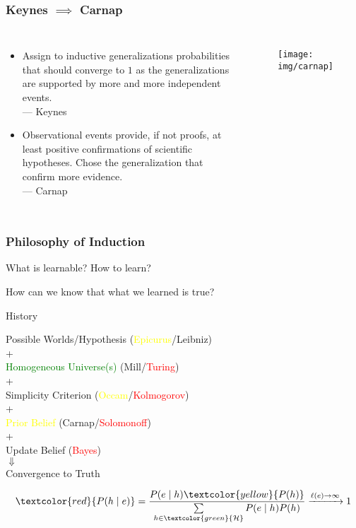 \documentclass[UTF8,11pt,colorlinks,compress,openany]{beamer}%
\begin{document}
\begin{frame}\frametitle{Keynes $\implies$ Carnap}
	\begin{columns}
			\begin{itemize}
				\item Assign to inductive generalizations probabilities that should converge to $1$ as the generalizations are supported by more and more independent events.\\
				\hfill --- Keynes
				\item Observational events provide, if not proofs, at least positive confirmations of scientific hypotheses. Chose the generalization that confirm more evidence.\\
				\hfill --- Carnap
			\end{itemize}
			\begin{figure}
				\texttt{[image: img/carnap]}
			\end{figure}
	\end{columns}
\end{frame}

\begin{frame}\frametitle{Philosophy of Induction}
	\centerline{\Large What is learnable? How to learn?}
	\centerline{\Large How can we know that what we learned is true?}
	\begin{block}{History}
		\begin{center}
			Possible Worlds/Hypothesis (\textcolor{yellow}{Epicurus}/Leibniz)\\
			+\\ 
			\textcolor{green}{Homogeneous Universe(s)} (Mill/\textcolor{red}{Turing})\\
			+\\
			Simplicity Criterion (\textcolor{yellow}{Occam}/\textcolor{red}{Kolmogorov})\\
			+\\
			\textcolor{yellow}{Prior Belief} (Carnap/\textcolor{red}{Solomonoff})\\
			+\\
			Update Belief (\textcolor{red}{Bayes})\\
			$\Downarrow$\\
			Convergence to Truth
		\end{center}
	\end{block}\vspace{-2ex}
	\[\textcolor{red}{P(h\mid e)}=\dfrac{P(e\mid h) \textcolor{yellow}{P(h)}}{\sum\limits_{h\in\textcolor{green}{\mathcal{H}}}P(e\mid h) P(h)}\xrightarrow{\ell(e)\to\infty} 1\]
\end{frame}
\end{document}
